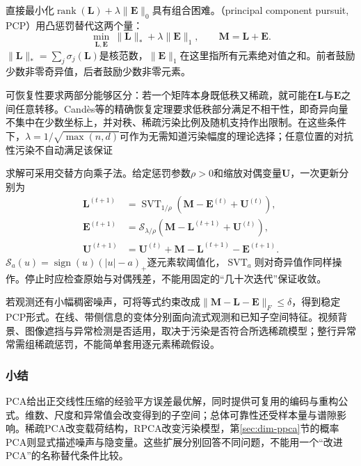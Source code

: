 直接最小化$\operatorname{rank}(\bm{L})+\lambda\lVert\bm{E}\rVert_0$具有组合困难。（principal component pursuit, PCP）用凸惩罚替代这两个量：
\begin{equation}
  \min_{\bm{L},\bm{E}}\
     \lVert\bm{L}\rVert_*+\lambda\lVert\bm{E}\rVert_1,
  \qquad \bm{M}=\bm{L}+\bm{E}.
  \label{eq:dim-pcp}
\end{equation}
$\lVert\bm{L}\rVert_*=\sum_j\sigma_j(\bm{L})$是核范数，$\lVert\bm{E}\rVert_1$在这里指所有元素绝对值之和。前者鼓励少数非零奇异值，后者鼓励少数非零元素。

可恢复性要求两部分能够区分：若一个矩阵本身既低秩又稀疏，就可能在$\bm{L}$与$\bm{E}$之间任意转移。Candès等的精确恢复定理要求低秩部分满足不相干性，即奇异向量不集中在少数坐标上，并对秩、稀疏污染比例及随机支持作出限制。在这些条件下，$\lambda=1/\sqrt{\max(n,d)}$可作为无需知道污染幅度的理论选择；任意位置的对抗性污染不自动满足该保证

求解可采用交替方向乘子法。给定惩罚参数$\rho>0$和缩放对偶变量$\bm{U}$，一次更新分别为
\begin{equation}
  \begin{aligned}
  \bm{L}^{(t+1)}&=\operatorname{SVT}_{1/\rho}
                  (\bm{M}-\bm{E}^{(t)}+\bm{U}^{(t)}),\\
  \bm{E}^{(t+1)}&=\mathcal{S}_{\lambda/\rho}
                  (\bm{M}-\bm{L}^{(t+1)}+\bm{U}^{(t)}),\\
  \bm{U}^{(t+1)}&=\bm{U}^{(t)}
                   +\bm{M}-\bm{L}^{(t+1)}-\bm{E}^{(t+1)}.
  \end{aligned}
  \label{eq:dim-rpca-admm}
\end{equation}
$\mathcal{S}_{a}(u)=\operatorname{sign}(u)(|u|-a)_+$逐元素软阈值化，$\operatorname{SVT}_{a}$则对奇异值作同样操作。停止时应检查原始与对偶残差，不能用固定的“几十次迭代”保证收敛。

若观测还有小幅稠密噪声，可将等式约束改成$\lVert\bm{M}-\bm{L}-\bm{E}\rVert_F\leq\delta$，得到稳定PCP形式。在线、带侧信息的变体分别面向流式观测和已知子空间特征。视频背景、图像遮挡与异常检测是否适用，取决于污染是否符合所选稀疏模型；整行异常常需组稀疏惩罚，不能简单套用逐元素稀疏假设。

\subsubsection{小结}
\label{sec:dim-pca-summary}

PCA给出正交线性压缩的经验平方误差最优解，同时提供可复用的编码与重构公式。维数、尺度和异常值会改变得到的子空间；总体可靠性还受样本量与谱隙影响。稀疏PCA改变载荷结构，RPCA改变污染模型，第\ref{sec:dim-ppca}节的概率PCA则显式描述噪声与隐变量。这些扩展分别回答不同问题，不能用一个“改进PCA”的名称替代条件比较。

